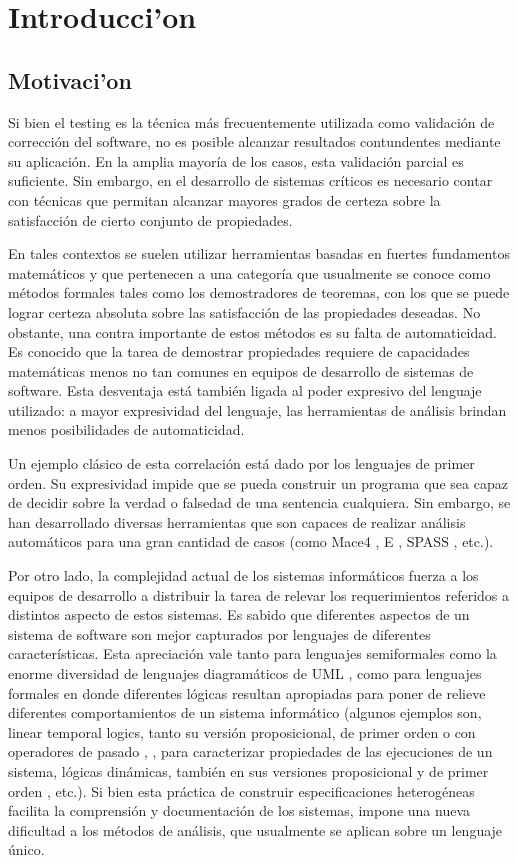 \chapter{Introducci'on}
\section{Motivaci'on}

Si bien el testing es la técnica más frecuentemente utilizada como validación de corrección del software, no es posible alcanzar resultados contundentes mediante su aplicación. En la amplia mayoría de los casos, esta validación parcial es suficiente. Sin embargo, en el desarrollo de sistemas críticos es necesario contar con técnicas que permitan alcanzar mayores grados de certeza sobre la satisfacción de cierto conjunto de propiedades.

En tales contextos se suelen utilizar herramientas basadas en fuertes fundamentos matemáticos y que pertenecen a una categoría que usualmente se conoce como métodos formales tales como los demostradores de teoremas, con los que se puede lograr certeza absoluta sobre las satisfacción de las propiedades deseadas. No obstante, una contra importante de estos métodos es su falta de automaticidad. Es conocido que la tarea de demostrar propiedades requiere de capacidades matemáticas menos no tan comunes en equipos de desarrollo de sistemas de software. Esta desventaja está también ligada al poder expresivo del lenguaje utilizado: a mayor expresividad del lenguaje, las herramientas de análisis brindan menos posibilidades de automaticidad.

Un ejemplo clásico de esta correlación está dado por los lenguajes de primer orden. Su expresividad impide que se pueda construir un programa que sea capaz de decidir sobre la verdad o falsedad de una sentencia cualquiera. Sin embargo, se han desarrollado diversas herramientas que son capaces de realizar análisis automáticos para una gran cantidad de casos (como Mace4 \cite{m05}, E \cite{s13}, SPASS \cite{WDFKSW09}, etc.). 

Por otro lado, la complejidad actual de los sistemas informáticos fuerza a los equipos de desarrollo a distribuir la tarea de relevar los requerimientos referidos a distintos aspecto de estos sistemas. Es sabido que diferentes aspectos de un sistema de software son mejor capturados por lenguajes de diferentes características. Esta apreciación vale tanto para lenguajes semiformales como la enorme diversidad de lenguajes diagramáticos de UML \cite{BRJ98}, como para lenguajes formales en donde diferentes lógicas resultan apropiadas para poner de relieve diferentes comportamientos de un sistema informático (algunos ejemplos son, linear temporal logics, tanto su versión proposicional, de primer orden o con operadores de pasado \cite{Pnu77}, \cite{MP95}, para caracterizar propiedades de las ejecuciones de un sistema, lógicas dinámicas, también en sus versiones proposicional y de primer orden \cite{HKT00}, etc.). Si bien esta práctica de construir especificaciones heterogéneas facilita la comprensión y documentación de los sistemas, impone una nueva dificultad a los métodos de análisis, que usualmente se aplican sobre un lenguaje único.

